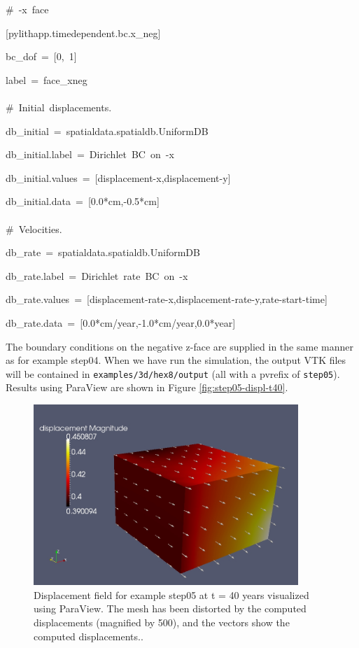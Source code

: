 \begin{lyxcode}
\#~-x~face

{[}pylithapp.timedependent.bc.x\_neg{]}

bc\_dof~=~{[}0,~1{]}

label~=~face\_xneg~\\
~\\


\#~Initial~displacements.

db\_initial~=~spatialdata.spatialdb.UniformDB

db\_initial.label~=~Dirichlet~BC~on~-x

db\_initial.values~=~{[}displacement-x,displacement-y{]}

db\_initial.data~=~{[}0.0{*}cm,-0.5{*}cm{]}~\\
~\\


\#~Velocities.

db\_rate~=~spatialdata.spatialdb.UniformDB

db\_rate.label~=~Dirichlet~rate~BC~on~-x

db\_rate.values~=~{[}displacement-rate-x,displacement-rate-y,rate-start-time{]}

db\_rate.data~=~{[}0.0{*}cm/year,-1.0{*}cm/year,0.0{*}year{]}
\end{lyxcode}
The boundary conditions on the negative z-face are supplied in the
same manner as for example step04. When we have run the simulation,
the output VTK files will be contained in \texttt{examples/3d/hex8/output}
(all with a pvrefix of \texttt{step05}). Results using ParaView are
shown in Figure \vref{fig:step05-displ-t40}.
\begin{figure}
\centering{}\includegraphics[width=10cm]{tutorials/3dhex8/figs/step05-displ-t40}\caption{Displacement field for example step05 at t = 40 years visualized using
ParaView. The mesh has been distorted by the computed displacements
(magnified by 500), and the vectors show the computed displacements.\label{fig:step05-displ-t40}.}
\end{figure}



